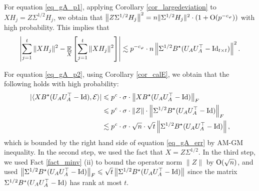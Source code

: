 	For equation \eqref{eq_gA_p1}, %
	applying Corollary \ref{cor_largedeviation} to $X H_j = Z \Sigma^{1/2} H_j$, we obtain that 
	${\left\|Z \Sigma^{1/2} H_j \right\|^2 } = { n \|\Sigma^{1/2} H_j\|^2} \cdot (1 + \operatorname{O}(p^{-c_\varphi}))$ with high probability. 
	This implies that
	\begin{align}
		\left\lvert\sum_{j=1}^t \|X H_j\|^2 - \mathop{\mathbb{E}}_{X}\left[ \sum_{j=1}^t \|X H_j\|^2 \right]\right\rvert \lesssim p^{-c_\varphi} \cdot n \left\| \Sigma^{1/2} B^{\star} (U_{A}U_A^{\top} - \operatorname{Id}_{t\times t}) \right\|^2. \label{eq_gA_err1}
	\end{align}

	For equation \eqref{eq_gA_p2}, 
	using Corollary \ref{cor_calE}, we obtain that the following holds with high probability:
	\begin{align}
		|\langle XB^{\star} (U_AU_A^{\top} - \operatorname{Id}), \mathcal{E} \rangle| &\leqslant p^{\mathit{c}} \cdot \sigma \cdot \left\| XB^{\star} (U_AU_A^{\top} - \operatorname{Id}) \right\|_{F} \nonumber \\
		&\leqslant p^{{\mathit{c}}} \cdot \sigma \cdot \|Z\| \cdot \left\| \Sigma^{1/2} B^{\star}(U_AU_A^{\top} -\operatorname{Id}) \right\|_{F} \nonumber \\
		&\lesssim p^{{\mathit{c}}} \cdot \sigma \cdot \sqrt{n}\cdot \sqrt{t}\left\| \Sigma^{1/2} B^{\star}(U_AU_A^{\top} -\operatorname{Id}) \right\|, \label{eq_gA_err2}
	\end{align}
	which is bounded by the right hand side of equation \eqref{eq_gA_err} by AM-GM inequality.
	In the second step, we used the fact that $X=Z\Sigma^{1/2}$.
	In the third step, we used Fact \ref{fact_minv} (ii) to bound the operator norm $\|Z\|$ by $\operatorname{O}(\sqrt{n})$, and used $\left\| \Sigma^{1/2} B^{\star}(U_AU_A^{\top} -\operatorname{Id}) \right\|_{F}\leqslant \sqrt{t} \left\| \Sigma^{1/2} B^{\star}(U_AU_A^{\top} -\operatorname{Id}) \right\|$ since the matrix $\Sigma^{1/2} B^{\star}(U_AU_A^{\top} -\operatorname{Id})$ has rank at most $t$.

